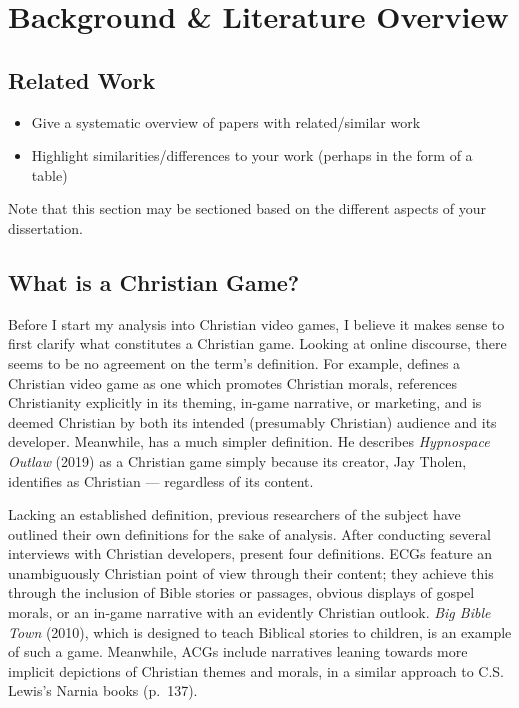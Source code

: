 \chapter{Background \& Literature Overview}


\section{Related Work}

  \begin{itemize}
   \item Give a systematic overview of papers with related/similar work
   \item Highlight similarities/differences to your work (perhaps in the form of a table)
  \end{itemize}

  Note that this section may be sectioned based on the different aspects of your dissertation.
\fi

\section{What is a Christian Game?}

Before I start my analysis into Christian video games, I believe it makes sense to first clarify what constitutes a Christian game. Looking at online discourse, there seems to be no agreement on the term's definition. For example, \textcite{moon_channel_why_2023} 
defines a Christian video game as one which promotes Christian morals, references Christianity explicitly in its theming, in-game narrative, or marketing, and is deemed Christian by both its intended (presumably Christian) audience and its developer. Meanwhile, \textcite{hartgrove_why_2022} has a much simpler definition. He describes \textit{Hypnospace Outlaw} (2019) as a Christian game simply because its creator, Jay Tholen, identifies as Christian --- regardless of its content.

Lacking an established definition, previous researchers of the subject have outlined their own definitions for the sake of analysis. After conducting several interviews with Christian developers, \textcite{schut_making_2013} present four definitions. \acp{ECG} feature an unambiguously Christian point of view through their content; they achieve this through the inclusion of Bible stories or passages, obvious displays of gospel morals, or an in-game narrative with an evidently Christian outlook. \textit{Big Bible Town} (2010), which is designed to teach Biblical stories to children, is an example of such a game. Meanwhile, \acp{ACG} include narratives leaning towards more implicit depictions of Christian themes and morals, in a similar approach to C.S. Lewis's Narnia books (p.\ 137). 

